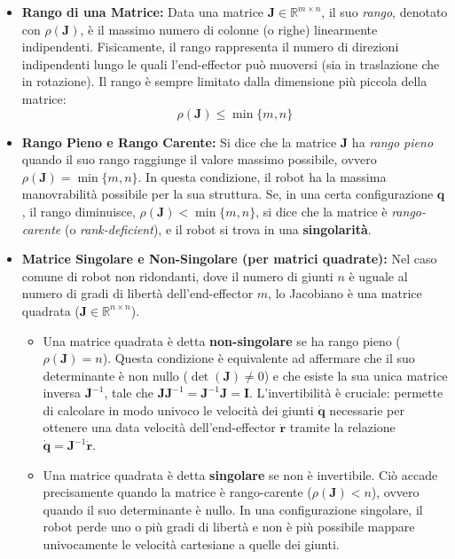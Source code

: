 ﻿\documentclass[11pt, a4paper]{article}
\begin{document}
\begin{itemize}
    \item \textbf{Rango di una Matrice:} Data una matrice $\bm{J} \in \mathbb{R}^{m \times n}$, il suo \textit{rango}, denotato con $\rho(\bm{J})$, è il massimo numero di colonne (o righe) linearmente indipendenti. Fisicamente, il rango rappresenta il numero di direzioni indipendenti lungo le quali l'end-effector può muoversi (sia in traslazione che in rotazione). Il rango è sempre limitato dalla dimensione più piccola della matrice:
    \[
        \rho(\bm{J}) \leq \min\{m, n\}
    \]

    \item \textbf{Rango Pieno e Rango Carente:} Si dice che la matrice \(\bm{J}\) ha \textit{rango pieno} quando il suo rango raggiunge il valore massimo possibile, ovvero $\rho(\bm{J}) = \min\{m, n\}$. In questa condizione, il robot ha la massima manovrabilità possibile per la sua struttura. Se, in una certa configurazione \(\bm{q}\), il rango diminuisce, $\rho(\bm{J}) < \min\{m, n\}$, si dice che la matrice è \textit{rango-carente} (o \textit{rank-deficient}), e il robot si trova in una \textbf{singolarità}.

    \item \textbf{Matrice Singolare e Non-Singolare (per matrici quadrate):} Nel caso comune di robot non ridondanti, dove il numero di giunti \(n\) è uguale al numero di gradi di libertà dell'end-effector \(m\), lo Jacobiano è una matrice quadrata ($\bm{J} \in \mathbb{R}^{n \times n}$).
    \begin{itemize}
        \item Una matrice quadrata è detta \textbf{non-singolare} se ha rango pieno ($\rho(\bm{J}) = n$). Questa condizione è equivalente ad affermare che il suo determinante è non nullo ($\det(\bm{J}) \neq 0$) e che esiste la sua unica matrice inversa $\bm{J}^{-1}$, tale che $\bm{J}\bm{J}^{-1} = \bm{J}^{-1}\bm{J} = \bm{I}$. L'invertibilità è cruciale: permette di calcolare in modo univoco le velocità dei giunti \(\dot{\bm{q}}\) necessarie per ottenere una data velocità dell'end-effector \(\bm{\dot{r}}\) tramite la relazione \(\dot{\bm{q}} = \bm{J}^{-1}\bm{\dot{r}}\).
        \item Una matrice quadrata è detta \textbf{singolare} se non è invertibile. Ciò accade precisamente quando la matrice è rango-carente ($\rho(\bm{J}) < n$), ovvero quando il suo determinante è nullo. In una configurazione singolare, il robot perde uno o più gradi di libertà e non è più possibile mappare univocamente le velocità cartesiane a quelle dei giunti.
    \end{itemize}


\end{itemize}
\end{document}
